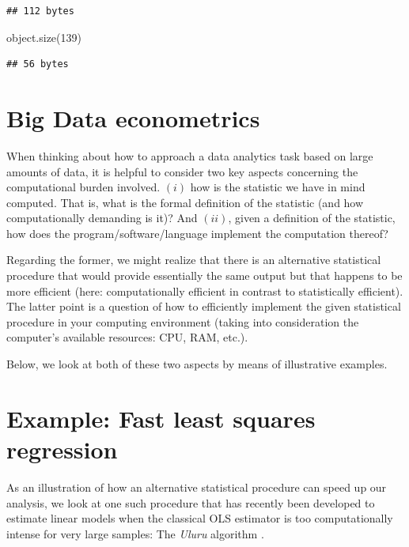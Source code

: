 \documentclass[
  12pt,
]{style/krantz}
\newenvironment{Shaded}{\begin{snugshade}}{\end{snugshade}}
\newcommand{\DecValTok}[1]{\textcolor[rgb]{0.00,0.00,0.81}{#1}}
\newcommand{\FunctionTok}[1]{\textcolor[rgb]{0.00,0.00,0.00}{#1}}
\newcommand{\NormalTok}[1]{#1}
\begin{document}
\begin{verbatim}
## 112 bytes
\end{verbatim}

\begin{Shaded}
\begin{Highlighting}[]
\FunctionTok{object.size}\NormalTok{(}\DecValTok{139}\NormalTok{)}
\end{Highlighting}
\end{Shaded}

\begin{verbatim}
## 56 bytes
\end{verbatim}

\hypertarget{big-data-econometrics}{%
\section{Big Data econometrics}\label{big-data-econometrics}}

When thinking about how to approach a data analytics task based on large amounts of data, it is helpful to consider two key aspects concerning the computational burden involved. \((i)\) how is the statistic we have in mind computed. That is, what is the formal definition of the statistic (and how computationally demanding is it)? And \((ii)\), given a definition of the statistic, how does the program/software/language implement the computation thereof?

Regarding the former, we might realize that there is an alternative statistical procedure that would provide essentially the same output but that happens to be more efficient (here: computationally efficient in contrast to statistically efficient). The latter point is a question of how to efficiently implement the given statistical procedure in your computing environment (taking into consideration the computer's available resources: CPU, RAM, etc.).

Below, we look at both of these two aspects by means of illustrative examples.

\hypertarget{example-fast-least-squares-regression}{%
\section{Example: Fast least squares regression}\label{example-fast-least-squares-regression}}

As an illustration of how an alternative statistical procedure can speed up our analysis, we look at one such procedure that has recently been developed to estimate linear models when the classical OLS estimator is too computationally intense for very large samples: The \emph{Uluru} algorithm \citep{dhillon_2013}.
\end{document}

